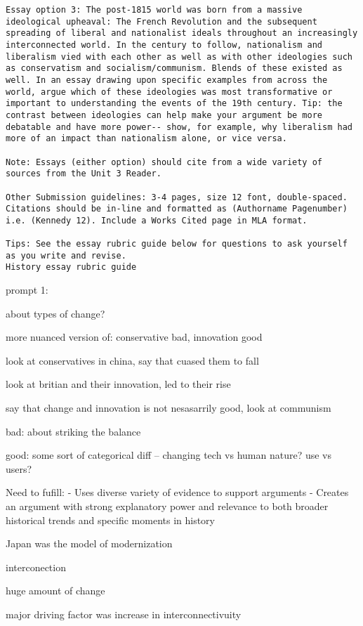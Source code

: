 \documentclass[letterpaper]{article}
\begin{document}
\begin{verbatim}
Essay option 3: The post-1815 world was born from a massive ideological upheaval: The French Revolution and the subsequent spreading of liberal and nationalist ideals throughout an increasingly interconnected world. In the century to follow, nationalism and liberalism vied with each other as well as with other ideologies such as conservatism and socialism/communism. Blends of these existed as well. In an essay drawing upon specific examples from across the world, argue which of these ideologies was most transformative or important to understanding the events of the 19th century. Tip: the contrast between ideologies can help make your argument be more debatable and have more power-- show, for example, why liberalism had more of an impact than nationalism alone, or vice versa.

Note: Essays (either option) should cite from a wide variety of sources from the Unit 3 Reader. 

Other Submission guidelines: 3-4 pages, size 12 font, double-spaced. Citations should be in-line and formatted as (Authorname Pagenumber) i.e. (Kennedy 12). Include a Works Cited page in MLA format. 

Tips: See the essay rubric guide below for questions to ask yourself as you write and revise. 
History essay rubric guide
\end{verbatim}

prompt 1:

about types of change?

more nuanced version of: conservative bad, innovation good

look at conservatives in china, say that cuased them to fall

look at britian and their innovation, led to their rise

say that change and innovation is not nesasarrily good, look at
communism

bad: about striking the balance

good: some sort of categorical diff -- changing tech vs human nature?
use vs users?

Need to fufill: - Uses diverse variety of evidence to support
arguments - Creates an argument with strong explanatory power and
relevance to both broader historical trends and specific moments in
history

Japan was the model of modernization

interconection

huge amount of change

major driving factor was increase in interconnectivuity
\end{document}
